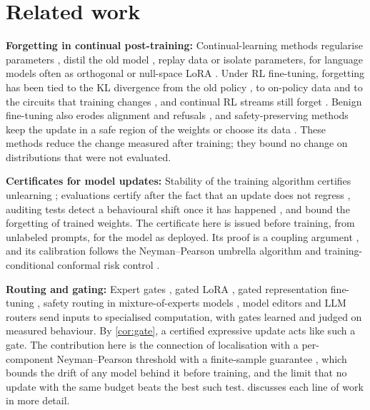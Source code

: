 \documentclass{article}
\theoremstyle{plain}
\theoremstyle{definition}
\theoremstyle{remark}
\begin{document}
\section{Related work}
\label{sec:related}

\textbf{Forgetting in continual post-training:} Continual-learning methods regularise parameters
\citep{kirkpatrick2017ewc}, distil the old model \citep{li2018lwf}, replay data \citep{rolnick2019replay} or isolate
parameters, for language models often as orthogonal or null-space LoRA \citep{wang2023olora,liang2024inflora,liang2025gainlora}.
Under RL fine-tuning, forgetting has been tied to the KL divergence from the old policy \citep{shenfeld2026razor}, to
on-policy data \citep{chen2025retaining,lai2025reinforcement} and to the circuits that training changes
\citep{rojasnunez2026mechanistic}, and continual RL streams still forget \citep{wolczyk2024finetuning,luo2026cpo,luo2026beyond}.
Benign fine-tuning also erodes alignment and refusals \citep{qi2024finetuning,li2024examining,ung2024chained}, and
safety-preserving methods keep the update in a safe region of the weights or choose its data
\citep{lyu2024keeping,yang2025asft,zhang2025guardrail,pham2025preventing,sun2026safety}. These methods reduce the change
measured after training; they bound no change on distributions that were not evaluated.

\textbf{Certificates for model updates:} Stability of the training algorithm certifies unlearning
\citep{ullah2021unlearning}; evaluations certify after the fact that an update does not regress
\citep{balachandran2026pay,mondal2026when}, auditing tests detect a behavioural shift once it has happened
\citep{richter2025auditing}, and \citet{friedman2026bounds} bound the forgetting of trained weights. The certificate here is
issued before training, from unlabeled prompts, for the model as deployed. Its proof is a coupling argument
\citep{lindvall1992coupling}, and its calibration follows the Neyman--Pearson umbrella algorithm and
training-conditional conformal risk control \citep{tong2018np,vovk2012conditional,bates2021rcps}.

\textbf{Routing and gating:} Expert gates \citep{aljundi2017expertgate}, gated LoRA \citep{liang2025gainlora,hoy2025stable},
gated representation fine-tuning \citep{zeng2025context}, safety routing in mixture-of-experts models
\citep{kim2025defending}, model editors \citep{mitchell2022serac} and LLM routers \citep{ong2024routellm} send inputs to
specialised computation, with gates learned and judged on measured behaviour. By \cref{cor:gate}, a certified
expressive update acts like such a gate. The contribution here is the connection of localisation with a per-component
Neyman--Pearson threshold with a finite-sample guarantee \citep{rigollet2011np,tong2018np}, which bounds the drift of
any model behind it before training, and the limit that no update with the same budget beats the best such test.
 discusses each line of work in more detail.
\end{document}
